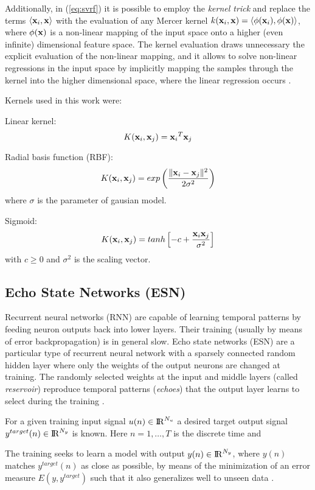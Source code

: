 Additionally, in (\ref{eq:svrf}) it is possible to employ the
\emph{kernel trick} and replace the terms $\left\langle\mathbf{x}_i,\mathbf{x}\right\rangle$ with
the evaluation of any Mercer kernel
$k(\mathbf{x}_i,\mathbf{x})=\left\langle\phi(\mathbf{x}_i),\phi(\mathbf{x})\right\rangle$, where
$\phi(\mathbf{x})$ is a non-linear mapping of the input space onto a
higher (even infinite) dimensional feature space.
%
The kernel evaluation draws unnecessary the explicit evaluation of the
non-linear mapping, and it allows to solve non-linear regressions in
the input space by implicitly mapping the samples through the kernel
into the higher dimensional space, where the linear regression occurs
\citep{Alonso2013}.

Kernels used in this work were:

Linear kernel: 
\begin{equation*}
K(\mathbf{x}_i,\mathbf{x}_j)={\mathbf{x}_i}^T \mathbf{x}_j
\end{equation*}

Radial basis function (RBF): 
\begin{equation*}
K(\mathbf{x}_i,\mathbf{x}_j) = exp\left( \frac{ \| \mathbf{x}_i - \mathbf{x}_j \|^2}{2 \sigma^2} \right)
\end{equation*}
where $\sigma$ is the parameter of gausian model.

Sigmoid:
\begin{equation*}
K(\mathbf{x}_i,\mathbf{x}_j) = tanh \left[ -c + \frac{ \mathbf{x}_i  \mathbf{x}_j }{ \sigma^2} \right]
\end{equation*}
with $c \geq 0$  and $\sigma^2$ is the scaling vector.




\subsection{Echo State Networks (ESN)}

Recurrent neural networks (RNN) are capable of learning temporal
patterns by feeding neuron outputs back into lower layers. Their
training (usually by means of error backpropagation) is in general
slow.
%
Echo state networks (ESN) are a particular type of recurrent neural
network with a sparsely connected random hidden layer where only the
weights of the output neurons are changed at training.  The randomly
selected weights at the input and middle layers (called \emph{reservoir})
reproduce temporal patterns (\emph{echoes}) that the output layer
learns to select during the training \citep{Lukose2009}.

For a given training input signal $u(n) \in \mathrm{I\negthinspace R}^{N_u}$ a desired target
output signal $y^{target}(n) \in \mathrm{I\negthinspace R}^{N_y}$ is known.
%
Here $n = 1,\ldots,T$ is the discrete time and 

The training seeks to learn a model with output $y(n) \in
\mathrm{I\negthinspace R}^{N_y}$, where $y(n)$ matches $y^{target}(n)$ as close as
possible, by means of the minimization of an error measure
$E(y,y^{target})$ such that it also generalizes well to unseen data
\citep{Lukose2012}.
